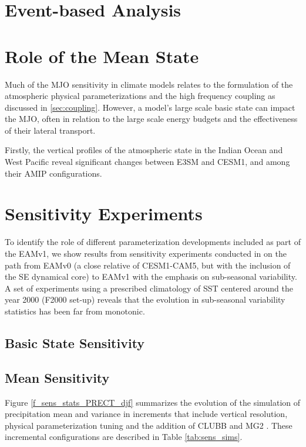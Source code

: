 \documentclass[draft,ms]{AGUTeX}
\begin{document}
\begin{article}
\section{Event-based Analysis}

\section{Role of the Mean State}

Much of the MJO sensitivity in climate models relates to the formulation of the atmospheric physical parameterizations and the high frequency coupling as discussed in \ref{sec:coupling}. However, a model's large scale basic state can impact the MJO, often in relation to the large scale energy budgets and the effectiveness of their lateral transport.

Firstly, the vertical profiles of the atmospheric state in the Indian Ocean and West Pacific reveal significant changes between E3SM and CESM1, and among their AMIP configurations. 


\section {Sensitivity Experiments}
\label{sec:sensitivity}
To identify the role of different parameterization developments included as part of the EAMv1, we show results from sensitivity experiments conducted in \cite{Xie2018} on the path from EAMv0 (a close relative of CESM1-CAM5, but with the inclusion of the SE dynamical core) to EAMv1 with the emphasis on sub-seasonal variability. A set of experiments using a prescribed climatology of SST centered around the year 2000 (F2000 set-up) reveals that the evolution in sub-seasonal variability statistics has been far from monotonic. 

\subsection{Basic State Sensitivity}

\subsection{Mean Sensitivity}
Figure \ref{f_sens_stats_PRECT_djf} summarizes the evolution of the simulation of precipitation mean and variance in increments that include vertical resolution, physical parameterization tuning and the addition of CLUBB \citep{Golaz2002} and MG2 \citep{Gettelman2015}. These incremental configurations are described in Table \ref{tab:sens_sims}. 


\end{article}
\end{document}
